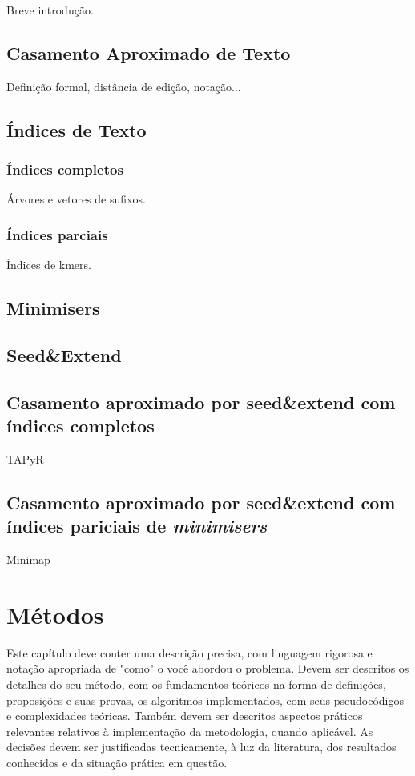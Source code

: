 \documentclass[bsc, oneside, scr, 12pt]{ufpethesis}
\newenvironment{comment}{\itshape\noindent<begin comment -- ommit this in the final version>\par}{\par\noindent<end comment>\rm}
\newcommand{\minimisers}{\textit{minimisers}\/\xspace}
\begin{document}
Breve introdução.


\section{Casamento Aproximado de Texto}

Definição formal, distância de edição, notação...

\section{Índices de Texto}

\subsection{Índices completos}

Árvores e vetores de sufixos.

\subsection{Índices parciais}

Índices de kmers.

\section{Minimisers}

\section{Seed\&Extend}

\section{Casamento aproximado por seed\&extend com índices completos}

TAPyR

\section{Casamento aproximado por seed\&extend com índices pariciais de \minimisers}

Minimap



\chapter{Métodos}

\begin{comment}
	Este capítulo deve conter uma descrição precisa, com linguagem rigorosa e notação apropriada de "como" o você abordou o problema. Devem ser descritos os detalhes do seu método, com os fundamentos teóricos na forma de definições, proposições e suas provas, os algoritmos implementados, com seus pseudocódigos e complexidades teóricas. Também devem ser descritos aspectos práticos relevantes relativos à implementação da metodologia, quando aplicável. As decisões devem ser justificadas tecnicamente, à luz da literatura,  dos resultados conhecidos e da situação prática em questão.
\end{comment}
\end{document}
